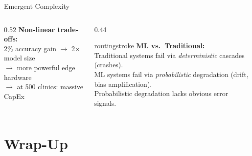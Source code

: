 \documentclass[aspectratio=169, 12pt]{beamer}
\begin{document}
\begin{frame}{Emergent Complexity}
\begin{columns}[T]
\begin{column}{0.52\textwidth}
    \vspace{0.15cm}
    \textbf{Non-linear trade-offs:}\\
    {\footnotesize
    2\% accuracy gain $\to$ 2$\times$ model size\\
    $\to$ more powerful edge hardware\\
    $\to$ at 500 clinics: massive CapEx}
  \end{column}
  \begin{column}{0.44\textwidth}
    \begin{mlsyscard}{routingstroke}
    {\footnotesize \textbf{ML vs.\ Traditional:}\\[0.1cm]
    Traditional systems fail via \emph{deterministic} cascades (crashes).\\[0.1cm]
    ML systems fail via \emph{probabilistic} degradation (drift, bias amplification).\\[0.1cm]
    Probabilistic degradation lacks obvious error signals.}
    \end{mlsyscard}
  \end{column}
\end{columns}

\end{frame}

\section{Wrap-Up}
\end{document}

